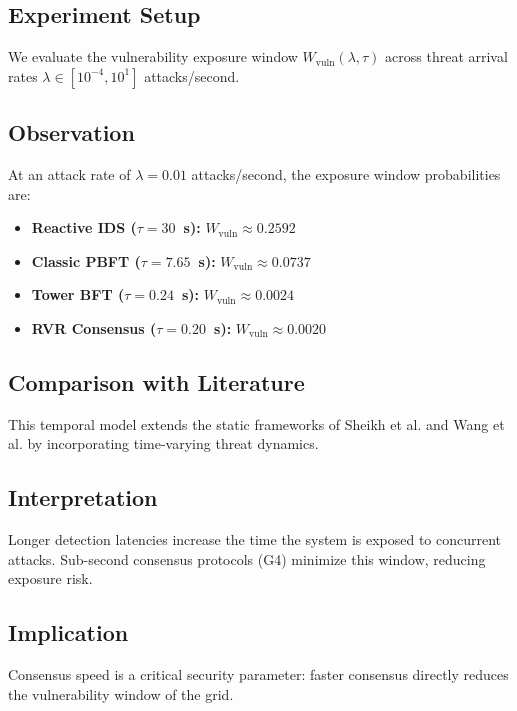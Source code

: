 \documentclass[12pt, oneside, a4paper]{report}
\theoremstyle{definition}
\theoremstyle{remark}
\newcommand{\Wvuln}{W_{\mathrm{vuln}}}
\begin{document}
\subsection{Experiment Setup}
We evaluate the vulnerability exposure window $\Wvuln(\lambda, \tau)$ across threat arrival rates $\lambda \in [10^{-4}, 10^1]$ attacks/second.

\subsection{Observation}
At an attack rate of $\lambda = 0.01$ attacks/second, the exposure window probabilities are:
\begin{itemize}
  \item \textbf{Reactive IDS ($\tau=30$~s):} $\Wvuln \approx 0.2592$
  \item \textbf{Classic PBFT ($\tau=7.65$~s):} $\Wvuln \approx 0.0737$
  \item \textbf{Tower BFT ($\tau=0.24$~s):} $\Wvuln \approx 0.0024$
  \item \textbf{RVR Consensus ($\tau=0.20$~s):} $\Wvuln \approx 0.0020$
\end{itemize}

\subsection{Comparison with Literature}
This temporal model extends the static frameworks of Sheikh et al. \cite{sheikh2020} and Wang et al. \cite{wang2025} by incorporating time-varying threat dynamics.

\subsection{Interpretation}
Longer detection latencies increase the time the system is exposed to concurrent attacks. Sub-second consensus protocols (G4) minimize this window, reducing exposure risk.

\subsection{Implication}
Consensus speed is a critical security parameter: faster consensus directly reduces the vulnerability window of the grid.

\bigskip

\end{document}
